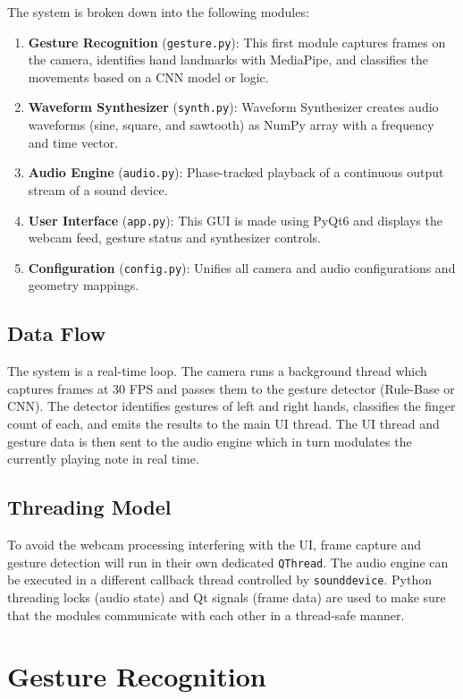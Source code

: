 \documentclass[conference]{IEEEtran}
\begin{document}
The system is broken down into the following modules:

\begin{enumerate}
\item \textbf{Gesture Recognition} (\texttt{gesture.py}): This first module captures frames on the camera, identifies hand landmarks with MediaPipe, and classifies the movements based on a CNN model or logic.
\item \textbf{Waveform Synthesizer} (\texttt{synth.py}): Waveform Synthesizer creates audio waveforms (sine, square, and sawtooth) as NumPy array with a frequency and time vector.
\item \textbf{Audio Engine} (\texttt{audio.py}): Phase-tracked playback of a continuous output stream of a sound device.
\item \textbf{User Interface} (\texttt{app.py}): This GUI is made using PyQt6 and displays the webcam feed, gesture status and synthesizer controls.
\item \textbf{Configuration} (\texttt{config.py}): Unifies all camera and audio configurations and geometry mappings.
\end{enumerate}

\subsection{Data Flow}

The system is a real-time loop. The camera runs a background thread which captures frames at 30 FPS and passes them to the gesture detector (Rule-Base or CNN). The detector identifies gestures of left and right hands, classifies the finger count of each, and emits the results to the main UI thread. The UI thread and gesture data is then sent to the audio engine which in turn modulates the currently playing note in real time.

\subsection{Threading Model}

To avoid the webcam processing interfering with the UI, frame capture and gesture detection will run in their own dedicated \texttt{QThread}. The audio engine can be executed in a different callback thread controlled by \texttt{sounddevice}. Python threading locks (audio state) and Qt signals (frame data) are used to make sure that the modules communicate with each other in a thread-safe manner.

\section{Gesture Recognition}
\end{document}
